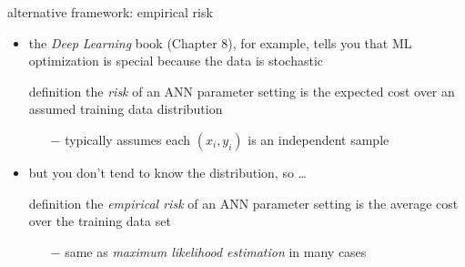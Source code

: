 \documentclass[svgnames,
               hyperref={colorlinks,citecolor=DeepPink4,linkcolor=FireBrick,urlcolor=Maroon},
               usepdftitle=false]  %
               {beamer}
\begin{document}
\begin{frame}{alternative framework: empirical risk}

\begin{itemize}
\item the \emph{Deep Learning} book (Chapter 8), for example, tells you that ML optimization is special because the data is stochastic

\begin{block}{definition}
the \emph{risk} of an ANN parameter setting is the expected cost over an assumed  training data distribution
\end{block}

    \begin{itemize}
    \item[$-$] typically assumes each $(x_i,y_i)$ is an independent sample
    \end{itemize}

\item but you don't tend to know the distribution, so \dots

\begin{block}{definition}
the \emph{empirical risk} of an ANN parameter setting is the average cost over the training data set
\end{block}

    \begin{itemize}
    \item[$-$] same as \emph{maximum likelihood estimation} in many cases
    \end{itemize}

\end{itemize}
\end{frame}
\end{document}
